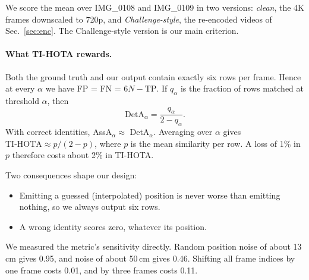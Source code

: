 \documentclass[11pt,a4paper]{article}
\begin{document}
We score the mean over IMG\_0108 and IMG\_0109 in two versions: \emph{clean}, the 4K frames downscaled
to 720p, and \emph{Challenge-style}, the re-encoded videos of Sec.~\ref{sec:enc}. The Challenge-style
version is our main criterion.

\paragraph{What TI-HOTA rewards.}
Both the ground truth and our output contain exactly six rows per frame. Hence at every $\alpha$ we have
FP = FN = $6N - \text{TP}$. If $q_\alpha$ is the fraction of rows matched at threshold $\alpha$, then
\begin{equation}
\text{DetA}_\alpha = \frac{q_\alpha}{2 - q_\alpha}.
\end{equation}
With correct identities, AssA$_\alpha \approx$ DetA$_\alpha$. Averaging over $\alpha$ gives
$\text{TI-HOTA} \approx p/(2-p)$, where $p$ is the mean similarity per row. A loss of 1\% in $p$ therefore
costs about 2\% in TI-HOTA.

Two consequences shape our design:
\begin{itemize}
\item Emitting a guessed (interpolated) position is never worse than emitting nothing, so we always output
six rows.
\item A wrong identity scores zero, whatever its position.
\end{itemize}
We measured the metric's sensitivity directly. Random position noise of about 13\,cm gives 0.95, and noise
of about 50\,cm gives 0.46. Shifting all frame indices by one frame costs 0.01, and by three frames costs 0.11.
\end{document}
